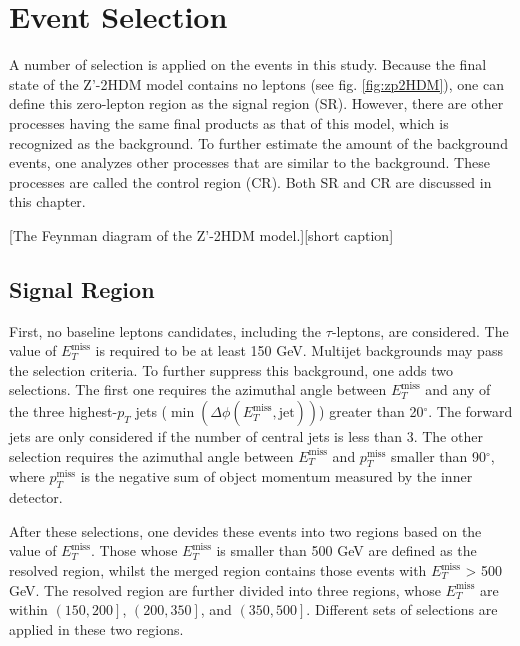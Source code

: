 \documentclass[class=NCU_thesis, crop=false]{standalone}
\begin{document}
\chapter{Event Selection}
A number of selection is applied on the events in this study. Because the final state of the Z'-2HDM model contains no leptons (see fig. \ref{fig:zp2HDM}), one can define this zero-lepton region as the signal region (SR). However, there are other processes having the same final products as that of this model, which is recognized as the background. To further estimate the amount of the background events, one analyzes other processes that are similar to the background. These processes are called the control region (CR). Both SR and CR are discussed in this chapter.

[The Feynman diagram of the Z'-2HDM model.][short caption]

\section{Signal Region}\label{SR}
	First, no baseline leptons candidates, including the $\tau$-leptons, are considered. The value of $E_T^{\mathrm{miss}}$ is required to be at least 150 GeV. Multijet backgrounds may pass the selection criteria. To further suppress this background, one adds two selections. The first one requires the azimuthal angle between $E_T^{\mathrm{miss}}$ and any of the three highest-$p_T$ jets ($\min(\Delta \phi(E_T^{\mathrm{miss}}, \mathrm{jet}))$) greater than 20$^\circ$. The forward jets are only considered if the number of central jets is less than 3. The other selection requires the azimuthal angle between $E_T^{\mathrm{miss}}$ and $p_T^{\mathrm{miss}}$ smaller than 90$^\circ$, where $p_T^{\mathrm{miss}}$ is the negative sum of object momentum measured by the inner detector.

	After these selections, one devides these events into two regions based on the value of $E_T^{\mathrm{miss}}$. Those whose $E_T^{\mathrm{miss}}$ is smaller than 500 GeV are defined as the resolved region, whilst the merged region contains those events with $E_T^{\mathrm{miss}}$ > 500 GeV. The resolved region are further divided into three regions, whose $E_T^{\mathrm{miss}}$ are within $\left(150, 200\right]$, $\left(200, 350\right]$, and $\left(350, 500\right]$. Different sets of selections are applied in these two regions.
\end{document}
